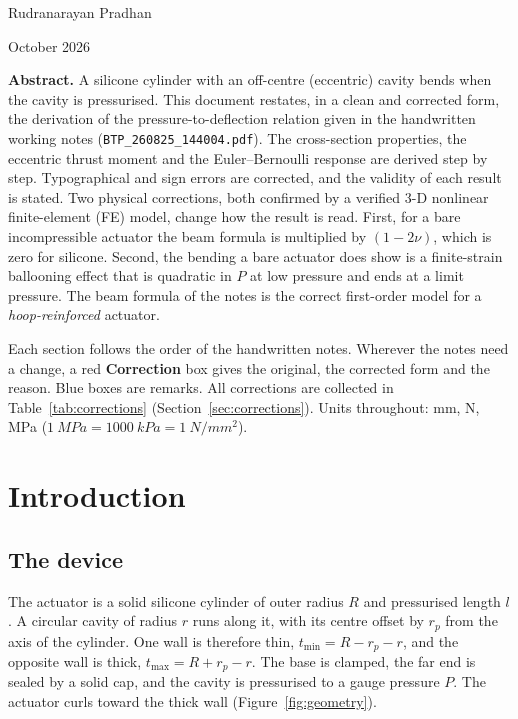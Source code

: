\documentclass[11pt,a4paper]{article}
\numberwithin{equation}{section}
\newcommand{\rp}{r_p}
\newcommand{\tmin}{t_{\min}}
\newcommand{\tmax}{t_{\max}}
\begin{document}
\begin{titlepage}
\vspace{1.6cm}
{\large Rudranarayan Pradhan\par}
\vspace{0.3cm}
{\normalsize October 2026\par}
\vfill
\begin{minipage}{0.86\textwidth}
\small\textbf{Abstract.}
A silicone cylinder with an off-centre (eccentric) cavity bends when the cavity is pressurised.
This document restates, in a clean and corrected form, the derivation of the pressure-to-deflection
relation given in the handwritten working notes (\texttt{BTP\_260825\_144004.pdf}).
The cross-section properties, the eccentric thrust moment and the Euler--Bernoulli response are
derived step by step. Typographical and sign errors are corrected, and the validity of each result is stated.
Two physical corrections, both confirmed by a verified 3-D nonlinear finite-element (FE) model, change how the result is read.
First, for a bare incompressible actuator the beam formula is multiplied by $(1-2\nu)$, which is zero for silicone.
Second, the bending a bare actuator does show is a finite-strain ballooning effect that is quadratic in $P$ at low pressure and ends at a limit pressure.
The beam formula of the notes is the correct first-order model for a \emph{hoop-reinforced} actuator.
\end{minipage}
\vspace{0.8cm}
\end{titlepage}

\tableofcontents
\vspace{1em}
\begin{remark}
Each section follows the order of the handwritten notes. Wherever the notes need a change, a red
\textcolor{corr}{\textbf{Correction}} box gives the original, the corrected form and the reason.
Blue boxes are remarks. All corrections are collected in Table~\ref{tab:corrections} (Section~\ref{sec:corrections}).
Units throughout: \si{mm}, \si{N}, \si{MPa} ($\SI{1}{MPa}=\SI{1000}{kPa}=\SI{1}{N/mm^2}$).
\end{remark}

\newpage
\section{Introduction}

\subsection{The device}
The actuator is a solid silicone cylinder of outer radius $R$ and pressurised length $l$. A circular
cavity of radius $r$ runs along it, with its centre offset by $\rp$ from the axis of the cylinder.
One wall is therefore thin, $\tmin = R-\rp-r$, and the opposite wall is thick, $\tmax = R+\rp-r$.
The base is clamped, the far end is sealed by a solid cap, and the cavity is pressurised to a gauge pressure $P$.
The actuator curls toward the thick wall (Figure~\ref{fig:geometry}).
\end{document}
